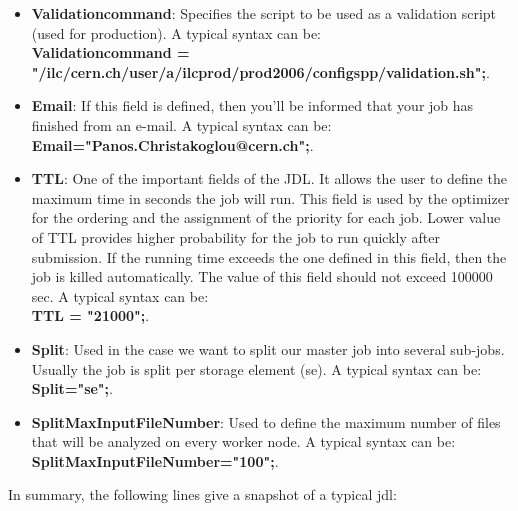 \begin{itemize}
\item \textbf{Validationcommand}: Specifies the script to be used as a validation script (used for production). A typical syntax can be: \\{\ttfamily \textbf{Validationcommand =\\"/ilc/cern.ch/user/a/ilcprod/prod2006/configspp/validation.sh";}}.

\item \textbf{Email}: If this field is defined, then you'll be informed that your job has finished from an e-mail. A typical syntax can be: \\{\ttfamily \textbf{Email="Panos.Christakoglou@cern.ch";}}.

\item \textbf{TTL}: One of the important fields of the JDL. It allows the user to define the maximum time in seconds the job will run. This field is used by the optimizer for the ordering and the assignment of the priority for each job. Lower value of TTL provides higher probability for the job to run quickly after submission. If the running time exceeds the one defined in this field, then the job is killed automatically. The value of this field should not exceed 100000 sec. A typical syntax can be: \\{\ttfamily \textbf{TTL = "21000";}}. 

\item \textbf{Split}: Used in the case we want to split our master job into several sub-jobs. Usually the job is split per storage element (se). A typical syntax can be: \\{\ttfamily \textbf{Split="se";}}.

\item \textbf{SplitMaxInputFileNumber}: Used to define the maximum number of files that will be analyzed on every worker node. A typical syntax can be: \\{\ttfamily \textbf{SplitMaxInputFileNumber="100";}}.

\end{itemize}

In summary, the following lines give a snapshot of a typical jdl:

